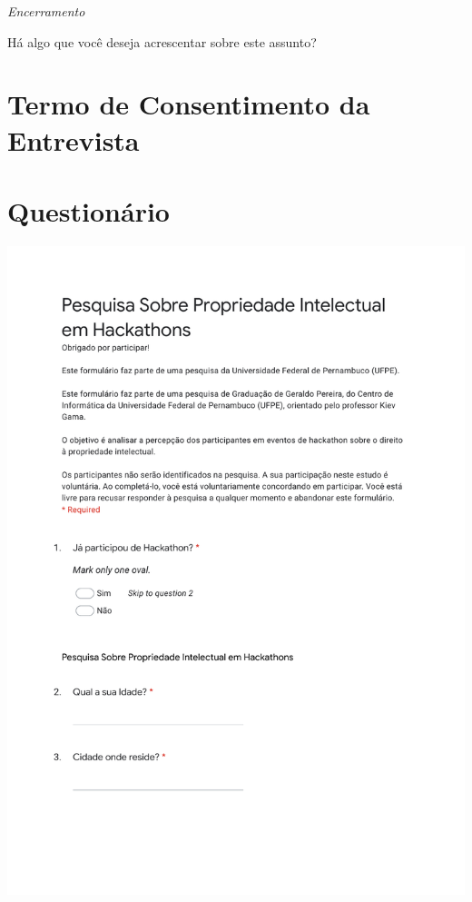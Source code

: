 \vspace{4mm}
\textit{Encerramento}

Há algo que você deseja acrescentar sobre este assunto?





\chapter{Termo de Consentimento da Entrevista}
\label{ap:termoConcent}
\begin{minipage}{10cm}

\end{minipage}


\chapter{Questionário}
\label{ap:questionario}
\includegraphics[scale=0.75]{appendix/FormularioGForm.pdf}

